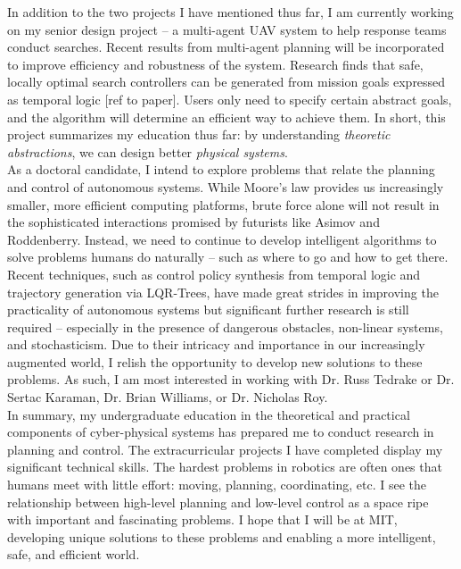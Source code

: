 \documentclass[]{article}
\begin{document}
In addition to the two projects I have mentioned thus far, I am currently working on my senior design project -- a multi-agent UAV system to help response teams conduct searches. Recent results from multi-agent planning will be incorporated to improve efficiency and robustness of the system. Research finds that safe, locally optimal search controllers can be generated from mission goals expressed as temporal logic [ref to paper]. Users only need to specify certain abstract goals, and the algorithm will determine an efficient way to achieve them. In short, this project summarizes my education thus far: by understanding \emph{theoretic abstractions}, we can design better \emph{physical systems}.\\

As a doctoral candidate, I intend to explore problems that relate the planning and control of autonomous systems. While Moore's law provides us increasingly smaller, more efficient computing platforms, brute force alone will not result in the sophisticated interactions promised by futurists like Asimov and Roddenberry. Instead, we need to continue to develop intelligent algorithms to solve problems humans do naturally -- such as where to go and how to get there. Recent techniques, such as control policy synthesis from temporal logic and trajectory generation via LQR-Trees, have made great strides in improving the practicality of autonomous systems but significant further research is still required -- especially in the presence of dangerous obstacles, non-linear systems, and stochasticism. Due to their intricacy and importance in our increasingly augmented world, I relish the opportunity to develop new solutions to these problems. As such, I am most interested in working with Dr. Russ Tedrake or Dr. Sertac Karaman, Dr. Brian Williams, or Dr. Nicholas Roy. \\

In summary, my undergraduate education in the theoretical and practical components of cyber-physical systems has prepared me to conduct research in planning and control. The extracurricular projects I have completed display my significant technical skills. The hardest problems in robotics are often ones that humans meet with little effort: moving, planning, coordinating, etc. I see the relationship between high-level planning and low-level control as a space ripe with important and fascinating problems. I hope that I will be at MIT, developing unique solutions to these problems and enabling a more intelligent, safe, and efficient world.
\end{document}
